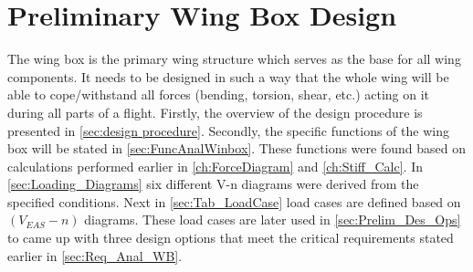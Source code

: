 \chapter{Preliminary Wing Box Design}
\label{ch:Prelim_WB_Des}
\noindent The wing box is the primary wing structure which serves as the base for all wing components. It needs to be designed in such a way that the whole wing will be able to cope/withstand all forces (bending, torsion, shear, etc.) acting on it during all parts of a flight. Firstly, the overview of the design procedure is presented in \autoref{sec:design procedure}. Secondly, the specific functions of the wing box will be stated in \autoref{sec:FuncAnalWinbox}. These functions were found based on calculations performed earlier in \autoref{ch:ForceDiagram} and 
\autoref{ch:Stiff_Calc}. In \autoref{sec:Loading_Diagrams} six different V-n diagrams were derived from the specified conditions. Next in \autoref{sec:Tab_LoadCase} load cases are defined based on $\left(V_{EAS}-n\right)$ diagrams. These load cases are later used in \autoref{sec:Prelim_Des_Ops} to came up with three design options that meet the critical requirements stated earlier in \autoref{sec:Req_Anal_WB}.

